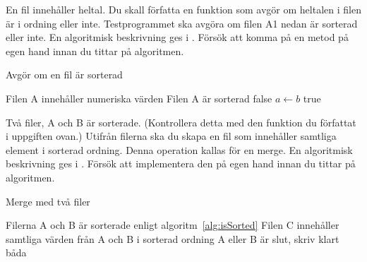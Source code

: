 \documentclass[a4paper]{miunasgn}
\begin{document}
\begin{questions}
	\question
	En fil innehåller heltal.
	Du skall författa en funktion som avgör om heltalen i filen är i ordning 
	eller inte.
	Testprogrammet ska avgöra om filen A1 nedan är sorterad eller inte.
  En algoritmisk beskrivning ges i .
	Försök att komma på en metod på egen hand innan du tittar på algoritmen.

  \begin{algorithm}
    \caption{Avgör om en fil är sorterad}\label{alg:isSorted}
    \begin{algorithmic}
      \Require Filen A innehåller numeriska värden
      \Ensure Filen A är sorterad
          \State \Return false
        \EndIf
        \State $a\gets b$
      \EndWhile
      \State \Return true
    \end{algorithmic}
  \end{algorithm}

	\question 
	Två filer, A och B är sorterade.
	(Kontrollera detta med den funktion du författat i uppgiften ovan.)
	Utifrån filerna ska du skapa en fil som innehåller samtliga element i
	sorterad ordning.
	Denna operation kallas för en merge.
  En algoritmisk beskrivning ges i .
	Försök att implementera den på egen hand innan du tittar på algoritmen.

  \begin{algorithm}
    \caption{Merge med två filer}\label{alg:merge}
    \begin{algorithmic}
      \Require Filerna A och B är sorterade enligt algoritm~\ref{alg:isSorted}
      \Ensure Filen C innehåller samtliga värden från A och B i sorterad ordning
        \Else
        \EndIf
      \EndWhile
      \Comment A eller B är slut, skriv klart båda
      \EndWhile
      \EndWhile
    \end{algorithmic}
  \end{algorithm}

\end{questions}
\end{document}
